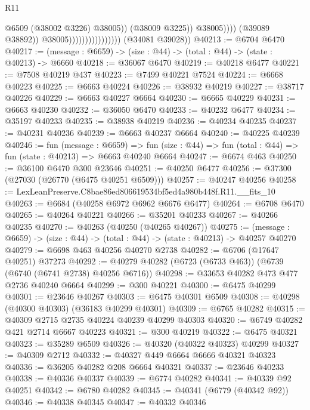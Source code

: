 \begin{lexlean}{R11}
\begin{coremodule}
                                                      @6509
                                                      (@38002 @3226)
                                                      @38005))
                                                  (@38009 @3225))
                                                @38005))))
                                        (@39089 @38892))
                                      @38005))))))))))))))))
      (@34081 @39028))
@40213 := @6704 @6470
@40217 := (message : @6659) -> (size : @44) -> (total : @44) -> (state : @40213) -> @6660
@40218 := @36067 @6470
@40219 := @40218 @6477
@40221 := @7508 @40219 @437
@40223 := @7499 @40221 @7524
@40224 := @6668 @40223
@40225 := @6663 @40224
@40226 := @38932 @40219
@40227 := @38717 @40226
@40229 := @6663 @40227 @6664
@40230 := @6665 @40229
@40231 := @6663 @40230
@40232 := @36050 @6470
@40233 := @40232 @6477
@40234 := @35197 @40233
@40235 := @38938 @40219
@40236 := @40234 @40235
@40237 := @40231 @40236
@40239 := @6663 @40237 @6664
@40240 := @40225 @40239
@40246 := fun (message : @6659) =>
  fun (size : @44) => fun (total : @44) => fun (state : @40213) => @6663 @40240 @6664
@40247 := @6674 @463
@40250 := @36100 @6470 @300 @23646
@40251 := @40250 @6477
@40256 := @37300 (@27030 (@26770 (@6475 @40251 @6509)))
@40257 := @40247 @40256
@40258 := LexLeanPreserve.C8bae86ed806619534bf5ed4a980b448f.R11.__fits_10
@40263 := @6684 (@40258 @6972 @6962 @6676 @6477)
@40264 := @6708 @6470
@40265 := @40264 @40221
@40266 := @35201 @40233
@40267 := @40266 @40235
@40270 := @40263 (@40250 (@40265 @40267))
@40275 := (message : @6659) -> (size : @44) -> (total : @44) -> (state : @40213) -> @40257 @40270
@40279 := @6698 @463 @40256 @40270 @2738
@40282 := @6706 (@17647 @40251) @37273
@40292 := @40279 @40282 (@6723 (@6733 @463)) (@6739 (@6740 (@6741 @2738) @40256 @6716))
@40298 := @33653 @40282 @473 @477 @2736 @40240 @6664
@40299 := @300 @40221
@40300 := @6475 @40299
@40301 := @23646 @40267
@40303 := @6475 @40301 @6509
@40308 := @40298 (@40300 @40303) (@36183 @40299 @40301)
@40309 := @6765 @40282
@40315 := @40309 @2715 @2735 @40224 @40239 @40299 @40303
@40320 := @6749 @40282 @421 @2714 @6667 @40223
@40321 := @300 @40219
@40322 := @6475 @40321
@40323 := @35289 @6509
@40326 := @40320 (@40322 @40323) @40299
@40327 := @40309 @2712
@40332 := @40327 @449 @6664 @6666 @40321 @40323
@40336 := @36205 @40282 @208 @6664 @40321
@40337 := @23646 @40233
@40338 := @40336 @40337
@40339 := @6774 @40282
@40341 := @40339 @92 @40251
@40342 := @6780 @40282
@40345 := @40341 (@6779 (@40342 @92))
@40346 := @40338 @40345
@40347 := @40332 @40346

\end{coremodule}
\end{lexlean}
